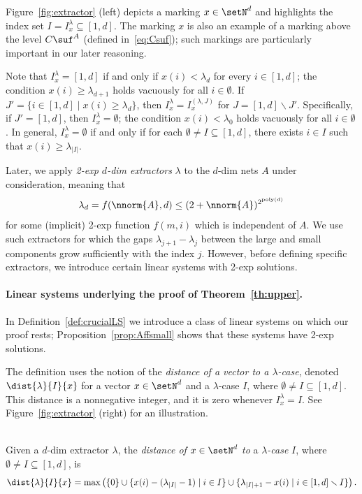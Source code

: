 Figure~\ref{fig:extractor} (left) depicts a marking $x\in\setN^d$
and highlights the index set $I=I^\lambda_x\subseteq[1,d]$. 
The marking $x$ is also an example of a marking 
above the level $C\suf^A$ (defined in~\eqref{eq:Csuf});
such markings are particularly important in our later reasoning.

Note that $I^\lambda_x=[1,d]$ if and only if $x(i)< \lambda_d$ for
every $i\in[1,d]$;
the condition  $x(i)\geq \lambda_{d+1}$ holds vacuously
for all $i\in\emptyset$.
If $J'=\{i\in[1,d]\mid x(i)\geq \lambda_d\}$, then 
$I^\lambda_x=I^{(\lambda,J)}_x$ for $J=[1,d]\smallsetminus J'$.
Specifically, if $J'=[1,d]$, then $I^\lambda_x=\emptyset$; the
condition
$x(i)<\lambda_{0}$ holds vacuously for all $i\in\emptyset$.
In general,  $I^\lambda_x=\emptyset$ if and only if for each
$\emptyset\neq I\subseteq[1,d]$, there exists $i\in I$ such that
$x(i)\geq \lambda_{|I|}$.

Later, we apply \emph{2-exp $d$-dim extractors} $\lambda$ to the $d$-dim nets $A$ under
consideration, meaning 
that 
\begin{equation*}
\lambda_d=f(\nnorm{A},d)\leq(2+\nnorm{A})^{2^{\text{poly}(d)}}
\end{equation*}
for some (implicit) 2-exp function $f(m,i)$ which is independent of $A$.
We use such extractors for which
the gaps $\lambda_{j+1}-\lambda_j$ between the large and small
components grow sufficiently with the index $j$.
However, before defining specific extractors, we introduce certain linear systems with
2-exp solutions.



\paragraph{Linear systems underlying the proof of Theorem~\ref{th:upper}.}
In Definition~\ref{def:crucialLS} we introduce a class of linear systems
on which our proof rests; Proposition~\ref{prop:Affsmall} shows that
these systems have 2-exp solutions.

The definition uses the notion of the \emph{distance of a vector to a
$\lambda$-case}, denoted $\dist{\lambda}{I}{x}$ for a vector
$x\in\setN^d$ and a $\lambda$-case $I$, where
$\emptyset\neq I\subseteq[1,d]$.
This distance is a nonnegative integer, and it is zero whenever
$I^\lambda_x=I$.
See Figure~\ref{fig:extractor} (right) for an illustration.


\begin{defi}
\hfill\\
Given a $d$-dim extractor $\lambda$, the \emph{distance of}
	$x\in\setN^d$ \emph{to} a \emph{$\lambda$-case} $I$, where
	$\emptyset\neq I\subseteq
[1,d]$, is 
	\[\dist{\lambda}{I}{x}=\max\left(\{0\}\cup
	\{x(i)-(\lambda_{|I|}-1)\mid i\in
I\}\cup\{\lambda_{|I|+1}-x(i)\mid i\in[1,d]\smallsetminus I\}\right).\]
\end{defi}	

